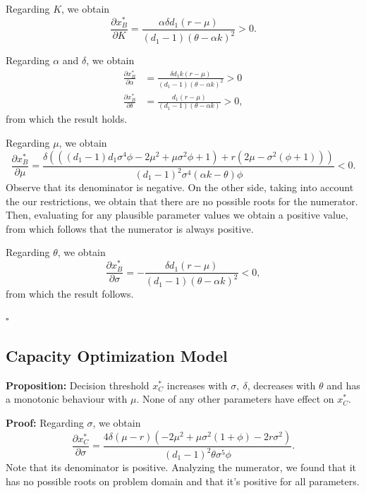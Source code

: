 Regarding $K$, we obtain
$$\frac{\partial x^*_B}{\partial K}=\frac{\alpha  \delta  d_1 (r-\mu )}{(d_1-1) (\theta -\alpha  k)^2}>0.$$


Regarding $\alpha$ and $\delta$, we obtain
\begin{align*}
\frac{\partial x^*_B}{\partial \alpha}&=\frac{\delta  d_1 k (r-\mu )}{(d_1-1) (\theta -\alpha  k)^2}>0\\
\frac{\partial x^*_B}{\partial \delta}&=\frac{d_1 (r-\mu )}{(d_1-1) (\theta -\alpha  k)}>0,
\end{align*}
from which the result holds.


Regarding $\mu$, we obtain
$$\frac{\partial x^*_B}{\partial \mu}=\frac{\delta  \left( \left( (d_1-1) d_1 \sigma ^4 \phi -2 \mu ^2+\mu  \sigma ^2 \phi+1 \right)+r \left(2 \mu -\sigma ^2 \left(\phi+1\right)\right)\right)}{(d_1-1)^2 \sigma ^4 (\alpha  k-\theta ) \phi}<0.$$
Observe that its denominator is negative. On the other side, taking into account the our restrictions, we obtain that there are no possible roots for the numerator. Then, evaluating for any plausible parameter values we obtain a positive value, from which follows that the numerator is always positive.

Regarding $\theta$, we obtain
$$\frac{\partial x^*_B}{\partial \sigma}=-\frac{\delta  d_1 (r-\mu )}{(d_1-1) (\theta -\alpha  k)^2}<0,$$
from which the result follows.
 
 
\begin{flushright}
 $\square$
\end{flushright}


\subsection{Capacity Optimization Model}

\textbf{Proposition:}
Decision threshold $x^*_C$ increases with $\sigma,\ \delta$, decreases with $\theta$ and has a monotonic behaviour with  $\mu$. None of any other parameters have effect on $x^*_C$.


\textbf{Proof:}
Regarding $\sigma$, we obtain
$$\frac{\partial x^*_C}{\partial \sigma}=\frac{4 \delta  (\mu -r) \left(-2 \mu ^2+\mu  \sigma ^2 (1+\phi)-2 r \sigma ^2\right)}{(d_1-1)^2 \theta  \sigma ^5 \phi}.$$
Note that its denominator is positive.
Analyzing the numerator, we found that it has no possible roots on problem domain and that it's positive for all parameters.

